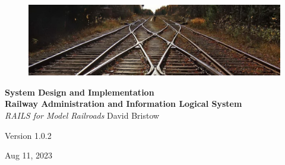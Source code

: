 \documentclass[letterpaper, oneside, 11pt]{book}
\begin{document}
\begin{titlepage}
	\raggedleft
	\begin{figure}[H]
	\centering
		\includegraphics[scale=1.53]{railway_track.jpg}
	\label{fig:track}
\end{figure}
	\vspace*{0.167\textheight}
	\textbf{\LARGE System Design and Implementation}\\[\baselineskip]
    \textbf{\textcolor{MyBlue}{\Huge R\Large ailway \Huge A\Large dministration and \Huge I\Large nformation \Huge L\Large ogical \Huge S\Large ystem}}\\[\baselineskip]
	{\Large \textit{RAILS for Model Railroads}}
	\vfill
    \vspace*{\baselineskip}
	{\small David Bristow}

	{\small Version 1.0.2}
	
	{\small Aug 11, 2023}
	\vspace*{3\baselineskip}
\end{titlepage}
\tableofcontents






\backmatter


\end{document}
